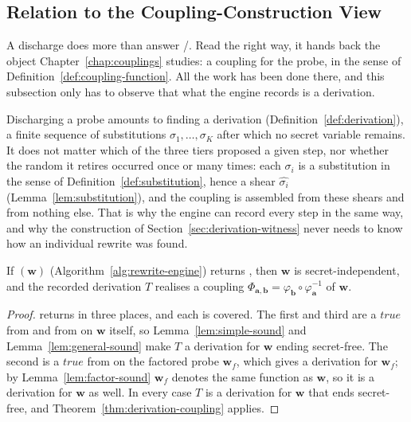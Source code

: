 
  \subsection{Relation to the Coupling-Construction View}
  \label{sec:coupling-view}

  A discharge does more than answer \Secure{}/\Insecure{}. Read the right way, it
  hands back the object Chapter~\ref{chap:couplings} studies: a coupling for the
  probe, in the sense of Definition~\ref{def:coupling-function}. All the work has
  been done there, and this subsection only has to observe that what the engine
  records is a derivation.

  Discharging a probe amounts to finding a derivation
  (Definition~\ref{def:derivation}), a finite sequence of substitutions
  $\sigma_1, \dots, \sigma_K$ after which no secret variable remains. It does not
  matter which of the three tiers proposed a given step, nor whether the random it
  retires occurred once or many times: each $\sigma_i$ is a substitution in the
  sense of Definition~\ref{def:substitution}, hence a shear $\widehat{\sigma_i}$
  (Lemma~\ref{lem:substitution}), and the coupling is assembled from these shears
  and from nothing else. That is why the engine can record every step in the same
  way, and why the construction of Section~\ref{sec:derivation-witness} never needs
  to know how an individual rewrite was found.

  \begin{corollary}
  \label{thm:rewrite-soundness}
  If \textup{}$(\mathbf{w})$
  (Algorithm~\ref{alg:rewrite-engine}) returns \textup{\Secure{}}, then
  $\mathbf{w}$ is secret-independent, and the recorded derivation $T$ realises a
  coupling $\Phi_{\mathbf{a},\mathbf{b}} = \varphi_{\mathbf{b}} \circ
  \varphi_{\mathbf{a}}^{-1}$ of $\mathbf{w}$.
  \end{corollary}

  \begin{proof}
   returns \Secure{} in three places, and each is covered.
  The first and third are a $\mathit{true}$ from  and from
   on $\mathbf{w}$ itself, so
  Lemma~\ref{lem:simple-sound} and Lemma~\ref{lem:general-sound} make $T$ a
  derivation for $\mathbf{w}$ ending secret-free. The second is a $\mathit{true}$
  from  on the factored probe $\mathbf{w}_f$, which gives a
  derivation for $\mathbf{w}_f$; by Lemma~\ref{lem:factor-sound} $\mathbf{w}_f$
  denotes the same function as $\mathbf{w}$, so it is a derivation for $\mathbf{w}$
  as well. In every case $T$ is a derivation for $\mathbf{w}$ that ends
  secret-free, and Theorem~\ref{thm:derivation-coupling} applies.
  \end{proof}


